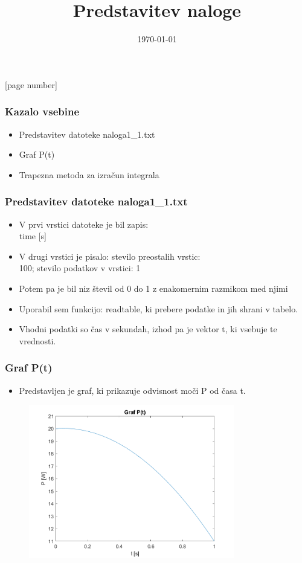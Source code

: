 \documentclass{beamer}
\title{Predstavitev naloge}
\date{\today}
\begin{document}
[page number]
\begin{frame}
  \titlepage
\end{frame}

\begin{frame}
  \frametitle{Kazalo vsebine}
  \begin{itemize}
    \item Predstavitev datoteke naloga1\_1.txt
    \item Graf P(t)
    \item Trapezna metoda za izračun integrala
  \end{itemize}
\end{frame}

\begin{frame}
  \frametitle{Predstavitev datoteke naloga1\_1.txt}
  \begin{itemize}
    \item V prvi vrstici datoteke je bil zapis: \\ time [s]
    \item V drugi vrstici je pisalo: stevilo preostalih  vrstic: \\
    100; stevilo podatkov v vrstici: 1
    \item Potem pa je bil niz števil od 0 do 1 z enakomernim razmikom med njimi
    \item Uporabil sem funkcijo: readtable, ki prebere podatke in jih shrani v tabelo.
    \item Vhodni podatki so čas v sekundah, izhod pa je vektor t, ki vsebuje te vrednosti.
  \end{itemize}
\end{frame}

\begin{frame}
  \frametitle{Graf P(t)}
  \begin{itemize}
    \item Predstavljen je graf, ki prikazuje odvisnost moči P od časa t.
  \end{itemize}
  \begin{figure}
    \centering
    \includegraphics[width=0.8\textwidth]{graf.png} 
  \end{figure}
\end{frame}
\end{document}

